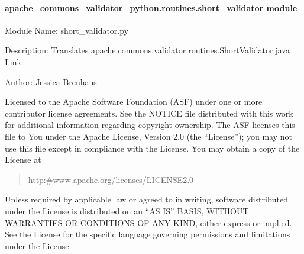 \documentclass[letterpaper,10pt,english]{sphinxmanual}
\begin{document}
\paragraph{apache\_commons\_validator\_python.routines.short\_validator module}
\label{\detokenize{apache_commons_validator_python.routines:module-apache_commons_validator_python.routines.short_validator}}\label{\detokenize{apache_commons_validator_python.routines:apache-commons-validator-python-routines-short-validator-module}}
\sphinxAtStartPar
Module Name: short\_validator.py

\sphinxAtStartPar
Description: Translates apache.commons.validator.routines.ShortValidator.java
Link: 

\sphinxAtStartPar
Author: Jessica Breuhaus
\begin{description}
\sphinxAtStartPar
Licensed to the Apache Software Foundation (ASF) under one or more
contributor license agreements.  See the NOTICE file distributed with
this work for additional information regarding copyright ownership.
The ASF licenses this file to You under the Apache License, Version 2.0
(the “License”); you may not use this file except in compliance with
the License.  You may obtain a copy of the License at
\begin{quote}

\sphinxAtStartPar
http:\#www.apache.org/licenses/LICENSE\sphinxhyphen{}2.0
\end{quote}

\sphinxAtStartPar
Unless required by applicable law or agreed to in writing, software
distributed under the License is distributed on an “AS IS” BASIS,
WITHOUT WARRANTIES OR CONDITIONS OF ANY KIND, either express or implied.
See the License for the specific language governing permissions and
limitations under the License.

\end{description}
\end{document}
